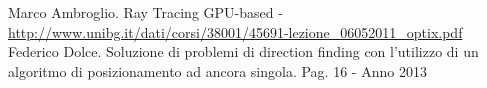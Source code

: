 \begin{thebibliography}{10}
\fancyfoot[C]{\thepage } 
Marco Ambroglio. Ray Tracing GPU-based - \url{http://www.unibg.it/dati/corsi/38001/45691-lezione_06052011_optix.pdf}
Federico Dolce. Soluzione di problemi di direction finding con l'utilizzo di un algoritmo di posizionamento ad ancora singola. Pag. 16 - Anno 2013
\end{thebibliography}
